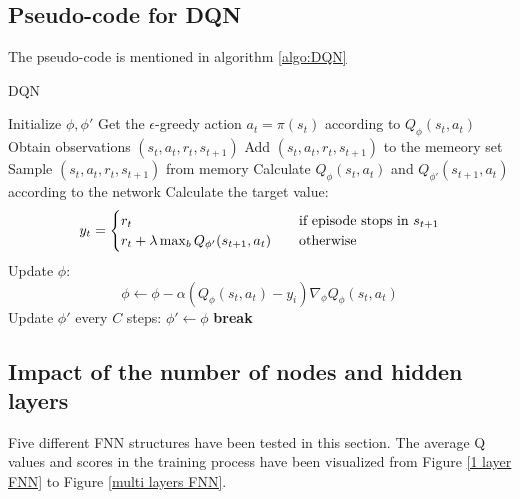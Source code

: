 \documentclass{article}
\begin{document}
\subsection{Pseudo-code for DQN}
The pseudo-code is mentioned in algorithm \ref{algo:DQN}

\begin{algorithm}[!htbp]
  \caption{DQN}
  \label{algo:DQN}
  \begin{algorithmic}[1]
    \State Initialize $\phi,\phi'$   
        \State Get the $\epsilon$-greedy action $a_t=\pi(s_t)$ according to $Q_{\phi}(s_t,a_t)$ 
        \State Obtain observations $(s_t,a_t,r_t,s_{t+1})$    
        \State Add $(s_t,a_t,r_t,s_{t+1})$ to the memeory set 
          
          \State Sample $(s_t,a_t,r_t,s_{t+1})$ from memory
          \State Calculate $Q_{\phi}(s_t,a_t)$ and $Q_{\phi'}(s_{t+1},a_t)$ according to the network
          \State Calculate the target value:
            \begin{equation*}
              y_t =
              \begin{cases}
                r_t       \quad  &\textup{if episode stops in $s_{t+1}$} \\
                r_t + \lambda\max_{b}Q_{\phi'}(s_{t+1}, a_t)    \quad &\textup{otherwise}
              \end{cases}
            \end{equation*}
          \State Update $\phi$:
          $$\phi\leftarrow\phi-\alpha(Q_{\phi}(s_t,a_t)-y_i)\nabla_{\phi}Q_{\phi}(s_t,a_t)$$ 
        \EndFor
      \EndFor
      \State Update $\phi'$ every $C$ steps: $\phi'\leftarrow\phi$ 
        \State \textbf{break}
      \EndIf
    \EndFor
  \end{algorithmic}
\end{algorithm}

\subsection{Impact of the number of nodes and hidden layers}

Five different FNN structures have been tested in this section. The average Q values and scores in the
training process have been visualized from Figure \ref{1 layer FNN} to Figure \ref{multi layers FNN}.
\end{document}
